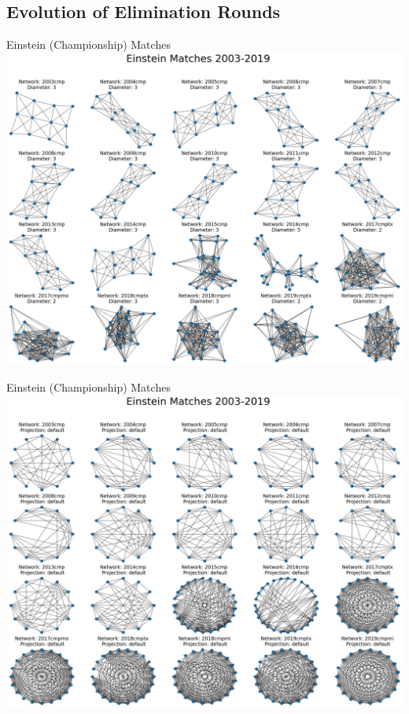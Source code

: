 \documentclass[10pt]{beamer}
\begin{document}
\subsection{Evolution of Elimination Rounds}
\begin{frame}{Einstein (Championship) Matches}
	\includegraphics[height=0.85\textheight]{../fig/NetworkPlot_cmp_2003_2019}
\end{frame}
\begin{frame}{Einstein (Championship) Matches}
	\centering
	\includegraphics[height=0.9\textheight]{../fig/NetworkPlot_cmp_2003_2019_shell}
\end{frame}
\end{document}
